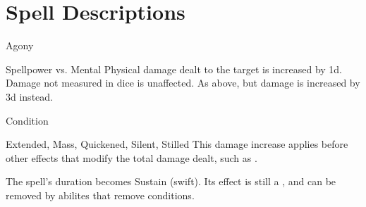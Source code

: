 \section{Spell Descriptions}
\begin{spellsection}{Agony}
\begin{spellheader}
\end{spellheader}
\begin{spellcontent}
\begin{spelltargetinginfo}
\end{spelltargetinginfo}
\begin{spelleffects}
\begin{spellattack}{Spellpower vs. Mental}
\spellsuccess Physical damage dealt to the target is increased by \plus1d. Damage not measured in dice is unaffected.
\spellcritical As above, but damage is increased by \plus3d instead.
\end{spellattack}
\spelldur Condition
\end{spelleffects}
\end{spellcontent}
\begin{spellfooter}
 Extended, Mass, Quickened, Silent, Stilled
\spellnotes This damage increase applies before other effects that modify the total damage dealt, such as .
\end{spellfooter}
\begin{spellsubcontent}
\begin{spellcantrip}
The spell's duration becomes Sustain (swift).
Its effect is still a , and can be removed by abilites that remove conditions.
\end{spellcantrip}
\end{spellsubcontent}
\end{spellsection}
